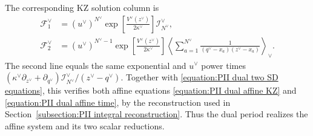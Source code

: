 \documentclass[a4paper,11pt]{article}
\newcommand{\cF}{\mathcal{F}}
\numberwithin{equation}{section}
\begin{document}
The corresponding KZ solution column is
\begin{equation}
	\label{equation:PII dual screening affine column}
	\begin{aligned}
		\cF_{1}^{\vee}
		&=(u^{\vee})^{N^{\vee}}
		\exp\left[\frac{V^{\vee}(z^{\vee})}{2\kappa^{\vee}}\right]
		\mathcal{I}_{N^{\vee}}^{\vee},\\
		\cF_{2}^{\vee}
		&=(u^{\vee})^{N^{\vee}-1}
		\exp\left[\frac{V^{\vee}(z^{\vee})}{2\kappa^{\vee}}\right]
		\left\langle\sum_{a=1}^{N^{\vee}}
		\frac{1}{(q^{\vee}-x_{a})(z^{\vee}-x_{a})}
		\right\rangle_{\vee}.
	\end{aligned}
\end{equation}
The second line equals the same exponential and $u^{\vee}$ power
times
$(\kappa^{\vee}\partial_{z^{\vee}}+\partial_{q^{\vee}})
\mathcal{I}_{N^{\vee}}^{\vee}/(z^{\vee}-q^{\vee})$.
Together with \eqref{equation:PII dual two SD equations}, this
verifies both affine equations
\eqref{equation:PII dual affine KZ} and
\eqref{equation:PII dual affine time}, by the reconstruction used in
Section~\ref{subsection:PII integral reconstruction}.  Thus the dual period realizes the affine system and
its two scalar reductions.
\end{document}
